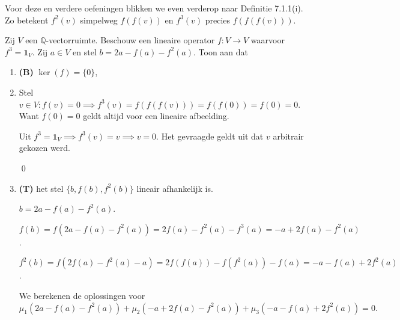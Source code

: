 \begin{oefening}[3.2.4]
    Voor deze en verdere oefeningen blikken we even verderop naar Definitie 7.1.1(i). Zo betekent $f^2(v)$ simpelweg $f(f(v))$ en $f^3(v)$ precies $f(f(f(v)))$.
    
    Zij $V$ een $\mathbb{Q}$-vectorruimte. Beschouw een lineaire operator $f \colon V \to V$ waarvoor $f^3 = \mathbf{1}_V$. Zij $a \in V$ en stel $b = 2a - f(a) - f^2(a)$. Toon aan dat
    \begin{enumerate}
        \item[(a)] \textbf{(B)} $\operatorname{ker}(f) = \{0\}$,
        \item[] 
          Stel \(v \in V: f(v) = 0 \implies f^3(v) = f(f(f(v))) = f(f(0)) = f(0) = 0.\)
            Want \(f(0)= 0\) geldt altijd voor een lineaire afbeelding. 

            Uit \(f^3 = \mathbf{1}_V \implies f^3(v) = v \implies v = 0.\) Het gevraagde geldt uit dat \(v\) arbitrair gekozen werd.
            
            \qed
        \item[(b)] \textbf{(T)} het stel $\{b, f(b), f^2(b)\}$ lineair afhankelijk is.
        
        \(b = 2a - f(a) - f^2(a) \).

        \(f(b) = f(2a - f(a) - f^2(a))
        = 2f(a) - f^2(a) - f^3(a)
        = -a + 2f(a) - f^2(a) \).

        \(f^2(b) = f(2f(a) - f^2(a) - a)
        = 2f(f(a)) - f(f^2(a)) - f(a)
        = -a-f(a)+2f^2(a)\).

        We berekenen de oplossingen voor \(\mu_1 (2a - f(a) - f^2(a)) + \mu_2 (-a + 2f(a) - f^2(a)) + \mu_3(-a-f(a)+2f^2(a)) = 0. \)


\end{enumerate}
\end{oefening}
